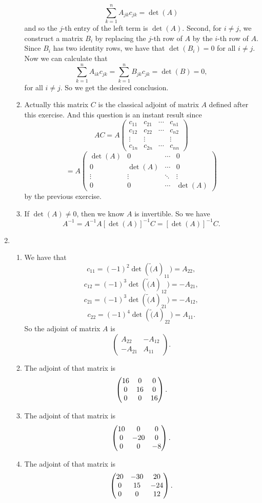 \begin{enumerate}
\begin{enumerate}
\[\sum_{k=1}^n{A_{jk}c_{jk}}=\det(A)\]
 and so the $j$-th entry of the left term is $\det(A)$. Second, for $i\neq j$, we construct a matrix $B_i$ by replacing the $j$-th row of $A$ by the $i$-th row of $A$. Since $B_i$ has two identity rows, we have that $\det(B_i)=0$ for all $i\neq j$. Now we can calculate that 
\[\sum_{k=1}^n{A_{ik}c_{jk}}=\sum_{k=1}^n{B_{jk}c_{jk}}=\det(B)=0,\]
 for all $i\neq j$. So we get the desired conclusion.
\item Actually this matrix $C$ is the classical adjoint of matrix $A$ defined after this exercise. And this question is an instant result since 
\[AC=A\begin{pmatrix}c_{11}&c_{21}&\cdots &c_{n1}\\c_{12}&c_{22}&\cdots &c_{n2}\\\vdots &\vdots & &\vdots \\c_{1n}&c_{2n}&\cdots &c_{nn}\end{pmatrix}\]
\[=A\begin{pmatrix}\det(A)&0&\cdots &0\\0&\det(A)&\cdots &0\\\vdots &\vdots &\ddots &\vdots \\0&0&\cdots &\det(A)\end{pmatrix}\]
 by the previous exercise.
\item If $\det(A)\neq 0$, then we know $A$ is invertible. So we have 
\[A^{-1}=A^{-1}A[\det(A)]^{-1}C=[\det(A)]^{-1}C.\]
\end{enumerate}
\item \begin{enumerate}
\item We have that 
\[c_{11}=(-1)^{2}\det(\tilde(A)_{11})=A_{22},\]
\[c_{12}=(-1)^{3}\det(\tilde(A)_{12})=-A_{21},\]
\[c_{21}=(-1)^{3}\det(\tilde(A)_{21})=-A_{12},\]
\[c_{22}=(-1)^{4}\det(\tilde(A)_{22})=A_{11}.\]
So the adjoint of matrix $A$ is 
\[\begin{pmatrix}A_{22}&-A_{12}\\-A_{21}&A_{11}\end{pmatrix}.\]
\item The adjoint of that matrix is $$\begin{pmatrix}16 & 0 & 0\cr 0 & 16 & 0\cr 0 & 0 & 16\end{pmatrix}.$$
\item The adjoint of that matrix is $$\begin{pmatrix}10 & 0 & 0\cr 0 & -20 & 0\cr 0 & 0 & -8\end{pmatrix}.$$
\item The adjoint of that matrix is $$\begin{pmatrix}20 & -30 & 20\cr 0 & 15 & -24\cr 0 & 0 & 12\end{pmatrix}.$$

\end{enumerate}
\end{enumerate}
